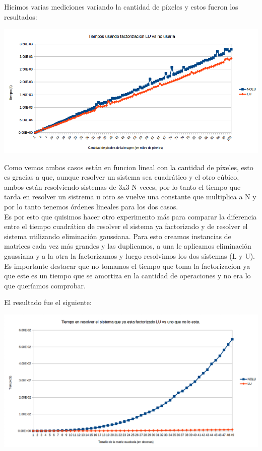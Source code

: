 Hicimos varias mediciones variando la cantidad de píxeles y estos fueron los resultados:

{\centering
    \includegraphics[scale=0.7]{informe/imagenes/LUVSNOLU.PNG} \\
}

Como vemos ambos casos están en funcion lineal con la cantidad de píxeles, esto es gracias a que, aunque resolver un sistema sea cuadrático y el otro cúbico, ambos están resolviendo sistemas de 3x3 N veces, por lo tanto el tiempo que tarda en resolver un sistrema u otro se vuelve una constante que multiplica a N y por lo tanto tenemos órdenes lineales para los dos casos.\\

Es por esto que quisimos hacer otro experimento más para comparar la diferencia entre el tiempo cuadrático de resolver el sistema ya factorizado y de resolver el sistema utilizando eliminación gaussiana.
Para esto creamos instancias de matrices cada vez más grandes y las duplicamos, a una le aplicamos eliminación gaussiana y a la otra la factorizamos y luego resolvimos los dos sistemas (L y U). Es importante destacar que no tomamos el tiempo que toma la factorizacion ya que este es un tiempo que se amortiza en la cantidad de operaciones y no era lo que queríamos comprobar.

El resultado fue el siguiente:

{\centering
    \includegraphics[scale=0.6]{informe/imagenes/LUVSNOLUDIM.PNG} \\
}

